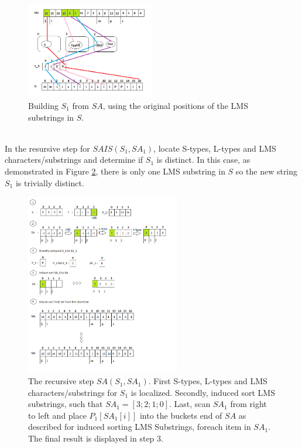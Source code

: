 \documentclass[12pt]{article} %
\begin{document}
\\
\begin{figure}[H]
    \centering
    \includegraphics[width=0.5\textwidth]{SAIS_LMSS}
    \captionsetup{width=0.8\textwidth}
    \caption{Building $S_1$ from $SA$, using the original positions of the LMS substrings in $S$.}
    \label{fig:SAIS_LMSS}
    
\end{figure}
\\
In the resursive step for $SAIS(S_1, SA_1)$, locate S-types, L-types and LMS characters/substrings and determine if $S_1$ is distinct. In this case, as demonstrated in Figure  \ref{fig:SAIS_RECURSIVE}, there is only one LMS substring in $S$ so the new string $S_1$ is trivially distinct.

\begin{figure}[H]
    \centering
    \includegraphics[width=0.6\textwidth]{SAIS_RECURSIVE}
    \captionsetup{width=0.8\textwidth}
    \caption{The recursive step $SA(S_1, SA_1)$.  First S-types, L-types and LMS characters/substrings for $S_1$ is localized. Secondly, induced sort LMS substrings, such that $SA_1 = [3;2;1;0]$. Last, scan $SA_1$ from right to left and place $P_1[SA_1[i]]$ into the buckets end of $SA$ as described for induced sorting LMS Substrings, foreach item in $SA_1$. The final result is displayed in step 3.}
    \label{fig:SAIS_RECURSIVE}
    
\end{figure}
\\
\end{document}
